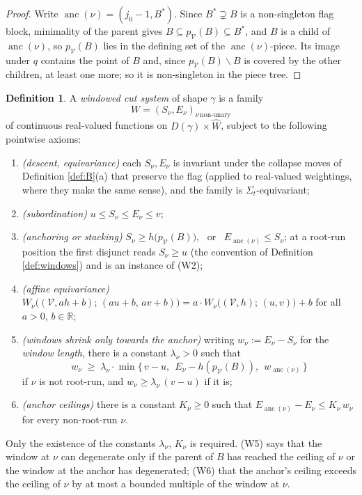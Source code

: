 \documentclass[12pt]{amsart}
\theoremstyle{definition}
\newtheorem{definition}[subsection]{Definition}
\theoremstyle{remark}
\newcommand{\Cal}[1]{\mathcal{#1}}
\newcommand{\anc}{\operatorname{anc}}            %
\newcommand{\Dg}[1]{D(#1)}                       %
\begin{document}
\begin{proof}
Write $\anc(\nu) = (j_0-1, B^{*})$. Since $B^{*}\supsetneq B$ is a non-singleton flag block, minimality of the parent gives $B\subseteq p_{\Cal{V}}(B)\subseteq B^{*}$, and $B$ is a child of $\anc(\nu)$, so $p_{\Cal{V}}(B)$ lies in the defining set of the $\anc(\nu)$-piece. Its image under $q$ contains the point of $B$ and, since $p_{\Cal{V}}(B)\smallsetminus B$ is covered by the other children, at least one more; so it is non-singleton in the piece tree.
\end{proof}

\begin{definition}\label{def:WCS}
A \emph{windowed cut system} of shape $\gamma$ is a family
\[ W = (S_\nu, E_\nu)_{\nu\,\text{non-unary}} \]
of continuous real-valued functions on $\Dg{\gamma}\times\widehat{W}$, subject to the following pointwise axioms:
\begin{enumerate}[label=(W\arabic*)]
    \item \emph{(descent, equivariance)} each $S_\nu, E_\nu$ is invariant under the collapse moves of Definition \ref{def:B}(a) that preserve the flag (applied to real-valued weightings, where they make the same sense), and the family is $\Sigma_t$-equivariant;
    \item \emph{(subordination)} $u\leq S_\nu \leq E_\nu\leq v$;
    \item \emph{(anchoring or stacking)} $S_\nu \geq h\big(p_{\Cal{V}}(B)\big)$, \ or \ $E_{\anc(\nu)} \leq S_\nu$; at a root-run position the first disjunct reads $S_\nu\geq u$ (the convention of Definition \ref{def:windows}) and is an instance of (W2);
    \item \emph{(affine equivariance)} $W_\nu\big((\Cal{V}, a h + b);\, (a u + b,\, a v + b)\big) = a\cdot W_\nu\big((\Cal{V},h);\,(u,v)\big) + b$ for all $a > 0$, $b\in\mathbb{R}$;
    \item \emph{(windows shrink only towards the anchor)} writing $w_\nu := E_\nu - S_\nu$ for the \emph{window length}, there is a constant $\lambda_\nu > 0$ such that
    \[ w_\nu \;\geq\; \lambda_\nu\cdot \min\big\{\, v-u,\ \ E_\nu - h(p_{\Cal{V}}(B)),\ \ w_{\anc(\nu)} \,\big\} \]
    if $\nu$ is not root-run, and $w_\nu \geq \lambda_\nu\,(v-u)$ if it is;
    \item \emph{(anchor ceilings)} there is a constant $K_\nu \geq 0$ such that $E_{\anc(\nu)} - E_\nu \leq K_\nu\, w_\nu$ for every non-root-run $\nu$.
\end{enumerate}
Only the existence of the constants $\lambda_\nu$, $K_\nu$ is required. (W5) says that the window at $\nu$ can degenerate only if the parent of $B$ has reached the ceiling of $\nu$ or the window at the anchor has degenerated; (W6) that the anchor's ceiling exceeds the ceiling of $\nu$ by at most a bounded multiple of the window at $\nu$.

\end{definition}
\end{document}
